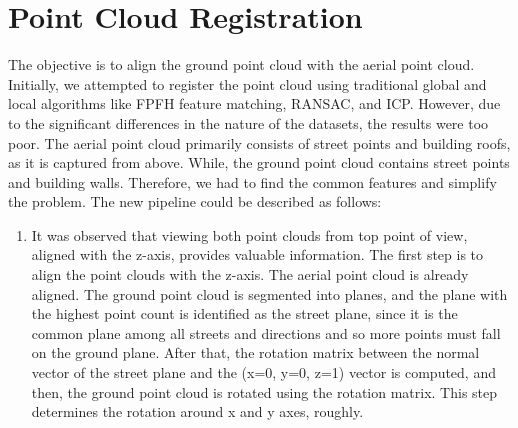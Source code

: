 \documentclass[11pt]{article}
\begin{document}
    \section{Point Cloud Registration}
    The objective is to align the ground point cloud with the aerial point cloud. Initially, we attempted
    to register the point cloud using traditional global and local algorithms like FPFH feature matching,
    RANSAC, and ICP. However, due to the significant differences in the nature of the datasets, the results were
    too poor. The aerial point cloud primarily consists of street points and building roofs, as it is captured
    from above. While, the ground point cloud contains street points and building walls. Therefore, we had to
    find the common features and simplify the problem. The new pipeline could be described as follows:
    \begin{enumerate}
        \item It was observed that viewing both point clouds from top point of view, aligned with the z-axis, provides
        valuable information. The first step is to align the point clouds with the z-axis. The aerial
        point cloud is already aligned. The ground point cloud is segmented into planes, and the plane
        with the highest point count is identified as the street plane, since it is the common plane among
        all streets and directions and so more points must fall on the ground plane. After that,
        the rotation matrix between the normal vector of the street plane and the (x=0, y=0, z=1) vector
        is computed, and then, the ground point cloud is rotated using the rotation matrix.
        This step determines the rotation around x and y axes, roughly.


\end{enumerate}
\end{document}
